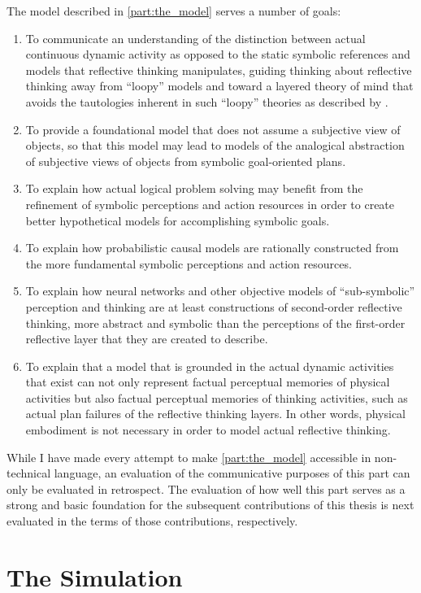 The model described in {\mbox{\autoref{part:the_model}}} serves a
number of goals:
\begin{enumerate}
\item To communicate an understanding of the distinction between
  actual continuous dynamic activity as opposed to the static symbolic
  references and models that reflective thinking manipulates, guiding
  thinking about reflective thinking away from ``loopy'' models and
  toward a layered theory of mind that avoids the tautologies inherent
  in such ``loopy'' theories as described by \cite{perlis:2008}.
\item To provide a foundational model that does not assume a
  subjective view of objects, so that this model may lead to models of
  the analogical abstraction of subjective views of objects from
  symbolic goal-oriented plans.
\item To explain how actual logical problem solving may benefit from
  the refinement of symbolic perceptions and action resources in order
  to create better hypothetical models for accomplishing symbolic
  goals.
\item To explain how probabilistic causal models are rationally
  constructed from the more fundamental symbolic perceptions and
  action resources.
\item To explain how neural networks and other objective models of
  ``sub-symbolic'' perception and thinking are at least constructions
  of second-order reflective thinking, more abstract and symbolic than
  the perceptions of the first-order reflective layer that they are
  created to describe.
\item To explain that a model that is grounded in the actual dynamic
  activities that exist can not only represent factual perceptual
  memories of physical activities but also factual perceptual memories
  of thinking activities, such as actual plan failures of the
  reflective thinking layers.  In other words, physical embodiment is
  not necessary in order to model actual reflective thinking.
\end{enumerate}
While I have made every attempt to make
{\mbox{\autoref{part:the_model}}} accessible in non-technical
language, an evaluation of the communicative purposes of this part can
only be evaluated in retrospect.  The evaluation of how well this part
serves as a strong and basic foundation for the subsequent
contributions of this thesis is next evaluated in the terms of those
contributions, respectively.

\section{The Simulation}



